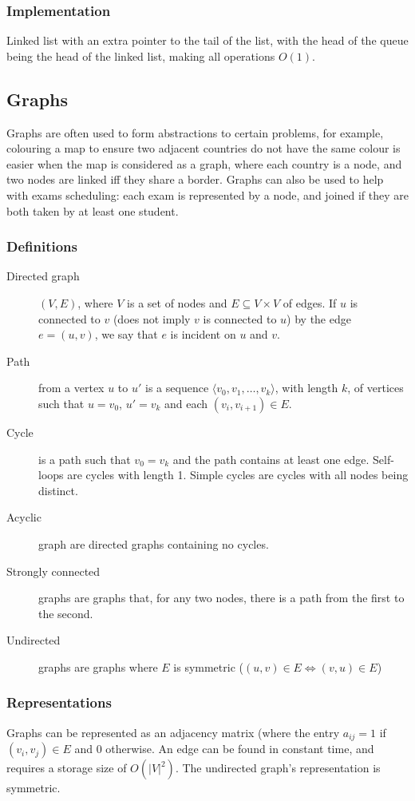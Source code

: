 \documentclass[10pt]{article}
\begin{document}
\subsubsection{Implementation}
Linked list with an extra pointer to the tail of the list, with the head of the queue being the head of the linked list, making all operations $O(1)$.
\subsection{Graphs}
Graphs are often used to form abstractions to certain problems, for example, colouring a map to ensure two adjacent countries do not have the same colour is easier when the map is considered as a graph, where each country is a node, and two nodes are linked iff they share a border.
Graphs can also be used to help with exams scheduling: each exam is represented by a node, and joined if they are both taken by at least one student.
\subsubsection{Definitions}
\begin{description}
	\item[Directed graph]$(V,E)$, where $V$ is a set of nodes and $E\subseteq V\times V$ of edges.  If $u$ is connected to $v$ (does not imply $v$ is connected to $u$) by the edge $e=(u,v)$, we say that $e$ is incident on $u$ and $v$.
	\item[Path]from a vertex $u$ to $u'$ is a sequence $\langle v_0,v_1,\ldots,v_k\rangle$, with length $k$, of vertices such that $u=v_0$, $u'=v_k$ and each $(v_i,v_{i+1})\in E$.
	\item[Cycle]is a path such that $v_0=v_k$ and the path contains at least one edge.  Self-loops are cycles with length 1.  Simple cycles are cycles with all nodes being distinct.
	\item[Acyclic] graph are directed graphs containing no cycles.
	\item[Strongly connected] graphs are graphs that, for any two nodes, there is a path from the first to the second.
	\item[Undirected] graphs are graphs where $E$ is symmetric ($(u,v)\in E\Leftrightarrow (v,u)\in E$) 
\end{description}
\subsubsection{Representations}
Graphs can be represented as an adjacency matrix (where the entry $a_{ij}=1$ if $(v_i,v_j)\in E$ and $0$ otherwise.  An edge can be found in constant time, and requires a storage size of $O(|V|^2)$.  The undirected graph's representation is symmetric.
\end{document}
